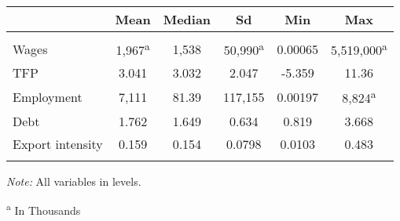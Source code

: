 \begin{threeparttable}

\begin{tabular}{lccccc} 
\toprule \toprule
					& Mean 		& Median & Sd 		& Min 	& Max \\
\midrule \\[-1.8ex]
Wages 				& 1,967\textsuperscript{a} & 1,538 & 50,990\textsuperscript{a} & 0.00065 	& 5,519,000\textsuperscript{a} \\
TFP 				& 3.041 	& 3.032 & 2.047 	& -5.359 	& 11.36 	\\
Employment 			& 7,111 	& 81.39 & 117,155 	& 0.00197 	& 8,824\textsuperscript{a} \\
Debt 				& 1.762 	& 1.649 & 0.634 	& 0.819 	& 3.668 	\\
Export intensity 	& 0.159 	& 0.154 & 0.0798 	& 0.0103 	& 0.483 	\\\\[-1.8ex]
\bottomrule \bottomrule
\end{tabular}

\begin{tablenotes}[flushleft]
\footnotesize
\item \textit{Note:} All variables in levels.
\item \textsuperscript{a} In Thousands
\end{tablenotes}

\end{threeparttable}